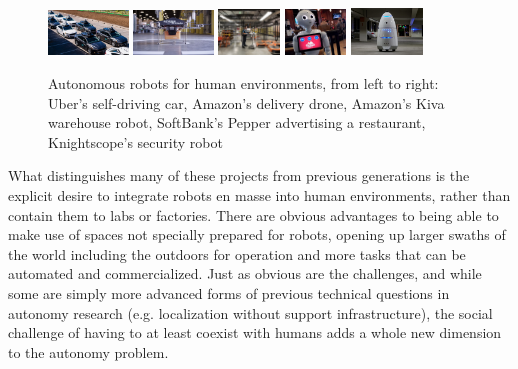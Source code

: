 \documentclass{sfuthesis}
\begin{document}
\begin{figure}[!t]
    \centering
    \includegraphics[width=0.19\textwidth]{uber.jpg} 
    \hspace{-0.25cm}
        \includegraphics[width=0.19\textwidth]{amazon_delivery.jpg} 
    \hspace{-0.25cm}
        \includegraphics[width=0.145\textwidth]{kiva.jpg} 
    \hspace{-0.25cm}
        \includegraphics[width=0.145\textwidth]{Pepper.jpg} 
    \hspace{-0.25cm}
    \includegraphics[width=0.17\textwidth]{knightscope.jpg} 
    \hspace{-0.25cm}

    \caption{Autonomous robots for human environments, from left to right: Uber's self-driving car, Amazon's delivery drone, Amazon's Kiva warehouse robot, SoftBank's Pepper advertising a restaurant, Knightscope's security robot}
    \label{fig:robots}
\end{figure}

What distinguishes many of these projects from previous generations is the explicit desire to integrate robots en masse into human environments, rather than contain them to labs or factories. There are obvious advantages to being able to make use of spaces not specially prepared for robots, opening up larger swaths of the world including the outdoors for operation and more tasks that can be automated and commercialized. Just as obvious are the challenges, and while some are simply more advanced forms of previous technical questions in autonomy research (e.g. localization without support infrastructure), the social challenge of having to at least coexist with humans adds a whole new dimension to the autonomy problem.
\end{document}
